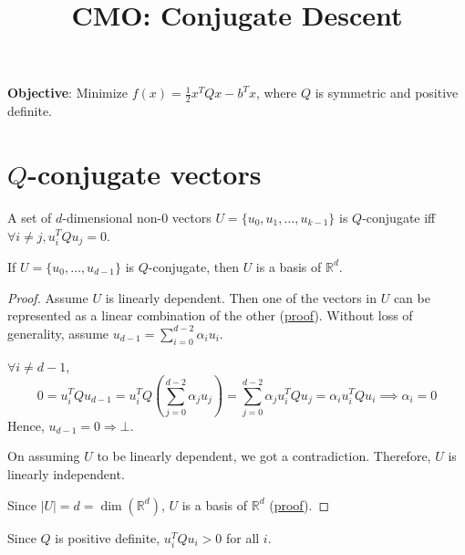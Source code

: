 

\usepackage{algorithm}
\usepackage{algpseudocode}

\title{CMO: Conjugate Descent}



\maketitle
\initMinimal{}

\textbf{Objective}: Minimize $f(x) = \frac{1}{2}x^TQx - b^Tx$,
where $Q$ is symmetric and positive definite.

\tableofcontents

\section{\texorpdfstring{$Q$}{Q}-conjugate vectors}

\begin{definition}
A set of $d$-dimensional non-0 vectors $U = \{u_0, u_1, \ldots, u_{k-1}\}$ is $Q$-conjugate
iff $\forall i \neq j, u_i^TQu_j = 0$.
\end{definition}

\begin{theorem}
If $U = \{u_0, \ldots, u_{d-1}\}$ is $Q$-conjugate, then $U$ is a basis of $\mathbb{R}^d$.
\end{theorem}
\begin{proof}
Assume $U$ is linearly dependent.
Then one of the vectors in $U$ can be represented as a linear combination of the other
(\href{https://sharmaeklavya2.github.io/theoremdep/nodes/linear-algebra/vector-spaces/linindep.html}{proof}).
Without loss of generality, assume $u_{d-1} = \sum_{i=0}^{d-2} \alpha_i u_i$.

$\forall i \neq d-1$,
\[ 0 = u_i^TQu_{d-1}
= u_i^TQ\left(\sum_{j=0}^{d-2} \alpha_j u_j \right)
= \sum_{j=0}^{d-2} \alpha_j u_i^TQu_j
= \alpha_i u_i^TQu_i
\implies \alpha_i = 0 \]
Hence, $u_{d-1} = 0 \Rightarrow \bot$.

On assuming $U$ to be linearly dependent, we got a contradiction.
Therefore, $U$ is linearly independent.

Since $|U| = d = \dim(\mathbb{R}^d)$,
$U$ is a basis of $\mathbb{R}^d$
(\href{https://sharmaeklavya2.github.io/theoremdep/nodes/linear-algebra/vector-spaces/basis/n-linindep-is-basis.html}{proof}).
\end{proof}

Since $Q$ is positive definite, $u_i^TQu_i > 0$ for all $i$.


